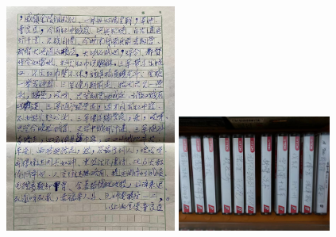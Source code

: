 \documentclass[cjk,slidestop,compress,mathserif,blue]{beamer}
\begin{document}
\frame
{
	\frametitle{}
\begin{figure}[h!]
\centering
\vspace{-0.15in}
\includegraphics[height=0.72\textwidth,width=0.50\textwidth,clip]{Figures_Peking-Opera/PekOpe_Liu-1.jpg}
\hskip 1pt
\includegraphics[height=0.35\textwidth,width=0.45\textwidth,clip]{Figures_Peking-Opera/PekOpe_Liu-2.jpg}
\label{Liu_Zengfu-2}
\end{figure}
}
\end{document}
